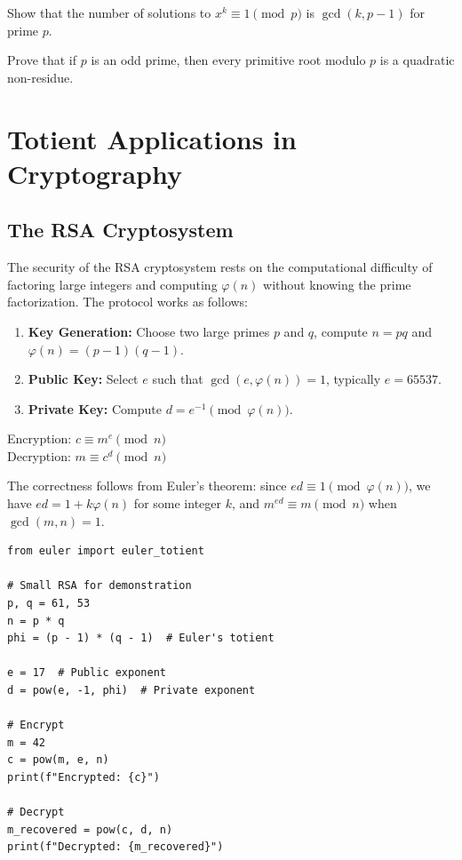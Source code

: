 \begin{exercise}
Show that the number of solutions to $x^k \equiv 1 \pmod{p}$ is $\gcd(k, p-1)$ for prime $p$.
\end{exercise}

\begin{exercise}
Prove that if $p$ is an odd prime, then every primitive root modulo $p$ is a quadratic non-residue.
\end{exercise}

\section{Totient Applications in Cryptography}

\subsection{The RSA Cryptosystem}

The security of the RSA cryptosystem rests on the computational difficulty of factoring large integers and computing $\varphi(n)$ without knowing the prime factorization. The protocol works as follows:

\begin{enumerate}
    \item \textbf{Key Generation:} Choose two large primes $p$ and $q$, compute $n = pq$ and $\varphi(n) = (p-1)(q-1)$.
    \item \textbf{Public Key:} Select $e$ such that $\gcd(e, \varphi(n)) = 1$, typically $e = 65537$.
    \item \textbf{Private Key:} Compute $d = e^{-1} \pmod{\varphi(n)}$.
\end{enumerate}

Encryption: $c \equiv m^e \pmod{n}$\\
Decryption: $m \equiv c^d \pmod{n}$

The correctness follows from Euler's theorem: since $ed \equiv 1 \pmod{\varphi(n)}$, we have $ed = 1 + k\varphi(n)$ for some integer $k$, and $m^{ed} \equiv m \pmod{n}$ when $\gcd(m,n) = 1$.

\begin{lstlisting}[caption={RSA encryption and decryption}, label=lst:rsa_crypto]
from euler import euler_totient

# Small RSA for demonstration
p, q = 61, 53
n = p * q
phi = (p - 1) * (q - 1)  # Euler's totient

e = 17  # Public exponent
d = pow(e, -1, phi)  # Private exponent

# Encrypt
m = 42
c = pow(m, e, n)
print(f"Encrypted: {c}")

# Decrypt
m_recovered = pow(c, d, n)
print(f"Decrypted: {m_recovered}")
\end{lstlisting}

